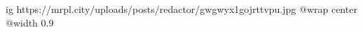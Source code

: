  
 
 
 
 

\ifcmt
  ig https://mrpl.city/uploads/posts/redactor/gwgwyx1gojrttvpu.jpg
  @wrap center
  @width 0.9
\fi
